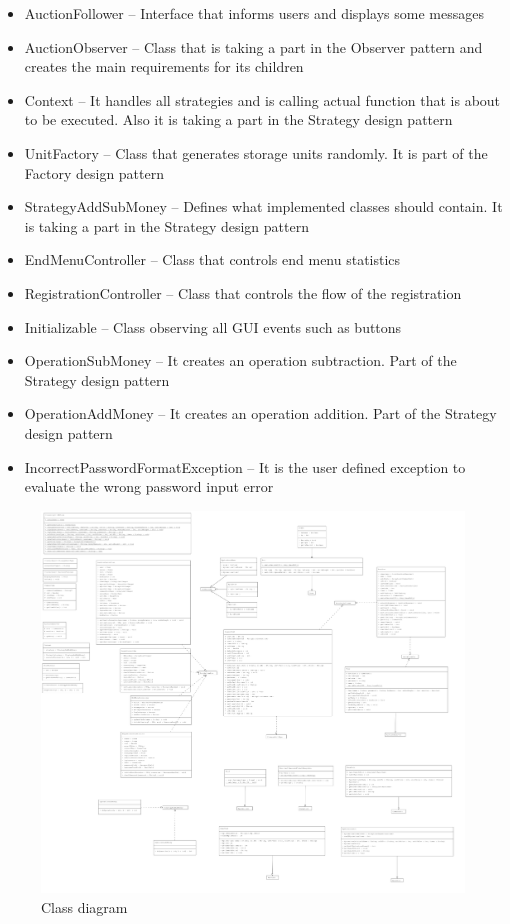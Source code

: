 \documentclass[
]{report}
\begin{document}
\begin{itemize}
\item
  AuctionFollower -- Interface that informs users and displays some messages
\item
  AuctionObserver -- Class that is taking a part in the Observer pattern and creates the main requirements for its children
\item
  Context -- It handles all strategies and is calling actual function that is about to be executed. Also it is taking a part in the Strategy design pattern
\item
  UnitFactory -- Class that generates storage units randomly. It is part of the Factory design pattern
\item
  StrategyAddSubMoney -- Defines what implemented classes should contain. It is taking a part in the Strategy design pattern
\item
  EndMenuController -- Class that controls end menu statistics
\item
  RegistrationController -- Class that controls the flow of the registration
\item
  Initializable -- Class observing all GUI events such as buttons
\item
  OperationSubMoney -- It creates an operation subtraction. Part of the Strategy design pattern
\item
  OperationAddMoney -- It creates an operation addition. Part of the Strategy design pattern
\item
  IncorrectPasswordFormatException -- It is the user defined exception to evaluate the wrong password input error
\end{itemize}

\begin{figure}
\centering
\includegraphics{images/UMLv1.0.2.png}
\caption{Class diagram}
\end{figure}
\end{document}
